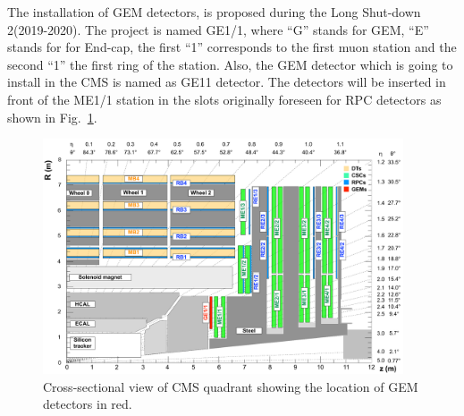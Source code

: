 The installation of GEM detectors, is proposed during the Long Shut-down 2(2019-2020).
The project is named GE1/1, where ``G'' stands for GEM, ``E'' stands for for End-cap, the first ``1'' corresponds to the first muon station and the second ``1'' the first ring of the station.
Also, the GEM detector which is going to install in the CMS is named as GE11 detector.
The detectors will be inserted in front of the ME1/1 station in the slots originally foreseen for RPC detectors as shown in Fig.~\ref{fig:GE11pos}. 
\begin{figure}[!htbp]
    \centering
    \includegraphics[width=0.95\textwidth]{figures/GEM/cms_upg_o_g_b_ni_ge1_r_140227.pdf}
    \caption{Cross-sectional view of CMS quadrant showing the location of GEM detectors in red.}
    \label{fig:GE11pos}
\end{figure}
